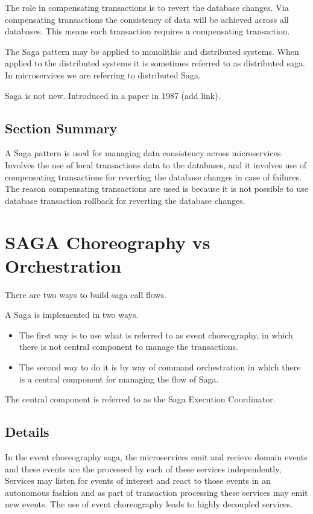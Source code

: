 \documentclass[a4paper, 11pt]{book}
\begin{document}
    The role in compensating transactions is to revert the database changes.
    Via compensating transactions the consistency of data will be achieved across all databases.
    This means each transaction requires a compensating transaction.

    The Saga pattern may be applied to monolithic and distributed systems.
    When applied to the distributed systems it is sometimes referred to as distributed saga.
    In microservices we are referring to distributed Saga.

    Saga is not new. Introduced in a paper in 1987 (add link).

    \subsection{Section Summary}
    A Saga pattern is used for managing data consistency across microservices.
    Involves the use of local transactions data to the databases, and it involves use of compensating transactions for reverting the database changes in case of failures.
    The reason compensating transactions are used is because it is not possible to use database transaction rollback for reverting the database changes.


    \section{SAGA Choreography vs Orchestration}

    There are two ways to build saga call flows.

    A Saga is implemented in two ways.
    \begin{itemize}
    \item The first way is to use what is referred to as event choreography, in which there is not central component to manage the transactions.
    \item The second way to do it is by way of command orchestration in which there is a central component for managing the flow of Saga.
    \end{itemize}

    The central component is referred to as the Saga Execution Coordinator.

    \subsection{Details}
    In the event choreography saga, the microservices emit and recieve domain events and these events are the processed by each of these services independently,
    Services may listen for events of interest and react to those events in an autonomous fashion and as part of transaction processing these services may emit new events.
    The use of event choreography leads to highly decoupled services.
\end{document}
